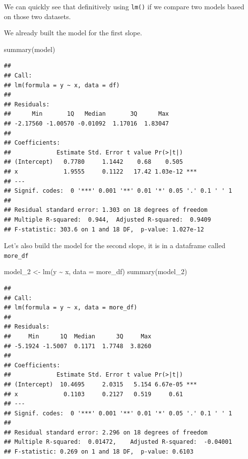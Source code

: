 \documentclass[
]{book}
\newenvironment{Shaded}{\begin{snugshade}}{\end{snugshade}}
\newcommand{\AttributeTok}[1]{\textcolor[rgb]{0.77,0.63,0.00}{#1}}
\newcommand{\FunctionTok}[1]{\textcolor[rgb]{0.00,0.00,0.00}{#1}}
\newcommand{\NormalTok}[1]{#1}
\newcommand{\OtherTok}[1]{\textcolor[rgb]{0.56,0.35,0.01}{#1}}
\newcommand{\SpecialCharTok}[1]{\textcolor[rgb]{0.00,0.00,0.00}{#1}}
\begin{document}
We can quickly see that definitively using \texttt{lm()} if we compare two models based on those two datasets.

We already built the model for the first slope.

\begin{Shaded}
\begin{Highlighting}[]
\FunctionTok{summary}\NormalTok{(model)}
\end{Highlighting}
\end{Shaded}

\begin{verbatim}
## 
## Call:
## lm(formula = y ~ x, data = df)
## 
## Residuals:
##      Min       1Q   Median       3Q      Max 
## -2.17560 -1.00570 -0.01092  1.17016  1.83047 
## 
## Coefficients:
##             Estimate Std. Error t value Pr(>|t|)    
## (Intercept)   0.7780     1.1442    0.68    0.505    
## x             1.9555     0.1122   17.42 1.03e-12 ***
## ---
## Signif. codes:  0 '***' 0.001 '**' 0.01 '*' 0.05 '.' 0.1 ' ' 1
## 
## Residual standard error: 1.303 on 18 degrees of freedom
## Multiple R-squared:  0.944,	Adjusted R-squared:  0.9409 
## F-statistic: 303.6 on 1 and 18 DF,  p-value: 1.027e-12
\end{verbatim}

Let's also build the model for the second slope, it is in a dataframe called \texttt{more\_df}

\begin{Shaded}
\begin{Highlighting}[]
\NormalTok{model\_2 }\OtherTok{\textless{}{-}} \FunctionTok{lm}\NormalTok{(y }\SpecialCharTok{\textasciitilde{}}\NormalTok{ x, }\AttributeTok{data =}\NormalTok{ more\_df)}
\FunctionTok{summary}\NormalTok{(model\_2)}
\end{Highlighting}
\end{Shaded}

\begin{verbatim}
## 
## Call:
## lm(formula = y ~ x, data = more_df)
## 
## Residuals:
##     Min      1Q  Median      3Q     Max 
## -5.1924 -1.5007  0.1171  1.7748  3.8260 
## 
## Coefficients:
##             Estimate Std. Error t value Pr(>|t|)    
## (Intercept)  10.4695     2.0315   5.154 6.67e-05 ***
## x             0.1103     0.2127   0.519     0.61    
## ---
## Signif. codes:  0 '***' 0.001 '**' 0.01 '*' 0.05 '.' 0.1 ' ' 1
## 
## Residual standard error: 2.296 on 18 degrees of freedom
## Multiple R-squared:  0.01472,	Adjusted R-squared:  -0.04001 
## F-statistic: 0.269 on 1 and 18 DF,  p-value: 0.6103
\end{verbatim}
\end{document}
